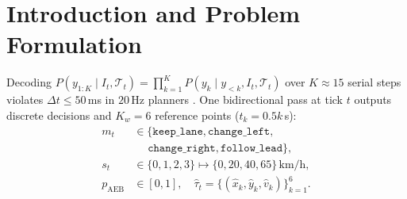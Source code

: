\documentclass[10pt,twocolumn,letterpaper]{article}
\begin{document}
\begin{abstract}
\cite{ioannou1993autonomous,rajamani2001experimental,treiber2000congested}. On $50$ MetaDrive maps ($100$\,Hz physics, \texttt{decision\_repeat=5} $\mapsto 20$\,Hz), \texttt{vision\_estimated} finishes $48/50$ ($96.0\%$ vs.\ $50/50$ \texttt{gt}). On CARLA 0.9.16 ($20$\,Hz sync), \texttt{vision\_estimated} finishes $47/50$ ($94.0\%$) and $93/100$ ($93.0\%$, $0.44$ crashes/km) vs.\ $83/100$ for a 2-layer Transformer (McNemar \cite{mcnemar1947note} $p=0.0063$, Holm--Bonferroni $p_{\text{Holm}}=0.0126$) and $p_{\text{raw}} < 0.01$ ($p_{\text{Holm}} \le 0.0126$) over a matched 15-token AR head ($69/100$, $198.4$\,ms), 2-layer MLP ($77/100$), \texttt{ExpertLabeler} ($75/100$), and random $395$M Laya ($71/100$).
\end{abstract}

\section{Introduction and Problem Formulation}
Decoding $P(y_{1:K} \mid I_t, \mathcal{T}_t) = \prod_{k=1}^{K} P(y_k \mid y_{<k}, I_t, \mathcal{T}_t)$ over $K \approx 15$ serial steps \cite{brohan2023rt2,kim2024openvla,liu2023visual} violates $\Delta t \le 50$\,ms in $20$\,Hz planners \cite{hu2023planning,jiang2023vad,li2022bevformer,codevilla2018end,chen2020learning,prakash2021multi,chitta2022transfuser,jaeger2023hidden}. One bidirectional pass \cite{devlin2019bert,warner2024modernbert,laya2024nonautoregressive} at tick $t$ outputs discrete decisions and $K_w=6$ reference points ($t_k = 0.5k$\,s):
\begin{align}
    m_t &\in \{\texttt{keep\_lane}, \texttt{change\_left}, \nonumber\\
        &\quad\; \texttt{change\_right}, \texttt{follow\_lead}\}, \\
    s_t &\in \{0, 1, 2, 3\} \mapsto \{0, 20, 40, 65\}\,\text{km/h}, \\
    p_{\text{AEB}} &\in [0, 1], \quad
    \hat{\tau}_t = \{(\hat{x}_k, \hat{y}_k, \hat{v}_k)\}_{k=1}^{6}.
\end{align}
\end{document}
